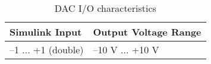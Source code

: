 \begin{table}[H]
    \centering
        \begin{tabularx}{0.6\textwidth}{ 
        | >{\raggedright\arraybackslash}X 
        | >{\raggedright\arraybackslash}X |}
        \hline
        \rowcolor[HTML]{34CDF9}\textbf{Simulink Input} & \textbf{Output Voltage Range} \\
        \hline
        –1 ... +1 (double)  & –10 V ... +10 V \\
        \hline
        \end{tabularx}
    \caption{DAC I/O characteristics}
    \label{DAC I/O characteristics}
\end{table}